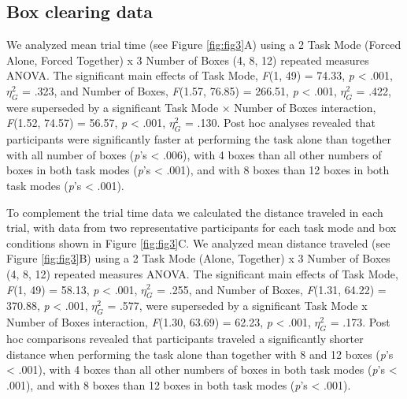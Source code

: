 \documentclass[
  man,
  floatsintext,
  longtable,
  nolmodern,
  notxfonts,
  notimes,
  colorlinks=true,linkcolor=blue,citecolor=blue,urlcolor=blue]{apa7}
\begin{document}
\subsection{Box clearing data}\label{box-clearing-data-1}

We analyzed mean trial time (see Figure \ref{fig:fig3}A) using a 2 Task
Mode (Forced Alone, Forced Together) x 3 Number of Boxes (4, 8, 12)
repeated measures ANOVA. The significant main effects of Task Mode,
\emph{F}(1, 49) = 74.33, \emph{p} \textless{} .001, \(\eta_{G}^{2}\) =
.323, and Number of Boxes, \emph{F}(1.57, 76.85) = 266.51, \emph{p}
\textless{} .001, \(\eta_{G}^{2}\) = .422, were superseded by a
significant Task Mode × Number of Boxes interaction, \emph{F}(1.52,
74.57) = 56.57, \emph{p} \textless{} .001, \(\eta_{G}^{2}\) = .130. Post
hoc analyses revealed that participants were significantly faster at
performing the task alone than together with all number of boxes
(\emph{p}'s \textless{} .006), with 4 boxes than all other numbers of
boxes in both task modes (\emph{p}'s \textless{} .001), and with 8 boxes
than 12 boxes in both task modes (\emph{p}'s \textless{} .001).

To complement the trial time data we calculated the distance traveled in
each trial, with data from two representative participants for each task
mode and box conditions shown in Figure \ref{fig:fig3}C. We analyzed
mean distance traveled (see Figure \ref{fig:fig3}B) using a 2 Task Mode
(Alone, Together) x 3 Number of Boxes (4, 8, 12) repeated measures
ANOVA. The significant main effects of Task Mode, \emph{F}(1, 49) =
58.13, \emph{p} \textless{} .001, \(\eta_{G}^{2}\) = .255, and Number of
Boxes, \emph{F}(1.31, 64.22) = 370.88, \emph{p} \textless{} .001,
\(\eta_{G}^{2}\) = .577, were superseded by a significant Task Mode x
Number of Boxes interaction, \emph{F}(1.30, 63.69) = 62.23, \emph{p}
\textless{} .001, \(\eta_{G}^{2}\) = .173. Post hoc comparisons revealed
that participants traveled a significantly shorter distance when
performing the task alone than together with 8 and 12 boxes (\emph{p}'s
\textless{} .001), with 4 boxes than all other numbers of boxes in both
task modes (\emph{p}'s \textless{} .001), and with 8 boxes than 12 boxes
in both task modes (\emph{p}'s \textless{} .001).

\clearpage
\end{document}
